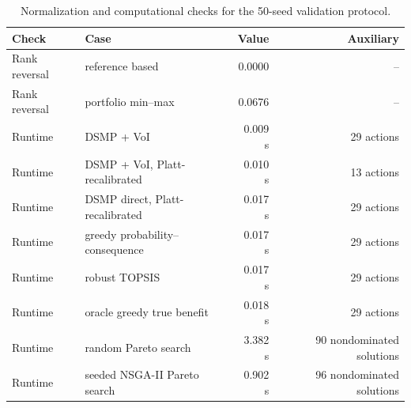 \begin{table}[t]
\centering
\footnotesize
\caption{Normalization and computational checks for the 50-seed validation protocol.}
\label{tab:validation-robustness-runtime}
\begin{tabular*}{\textwidth}{@{\extracolsep{\fill}}llrr}
\toprule
Check & Case & Value & Auxiliary \\
\midrule
Rank reversal & reference based & 0.0000 & -- \\
Rank reversal & portfolio min--max & 0.0676 & -- \\
Runtime & DSMP + VoI & 0.009 s & 29 actions \\
Runtime & DSMP + VoI, Platt-recalibrated & 0.010 s & 13 actions \\
Runtime & DSMP direct, Platt-recalibrated & 0.017 s & 29 actions \\
Runtime & greedy probability--consequence & 0.017 s & 29 actions \\
Runtime & robust TOPSIS & 0.017 s & 29 actions \\
Runtime & oracle greedy true benefit & 0.018 s & 29 actions \\
Runtime & random Pareto search & 3.382 s & 90 nondominated solutions \\
Runtime & seeded NSGA-II Pareto search & 0.902 s & 96 nondominated solutions \\
\bottomrule
\end{tabular*}
\end{table}
